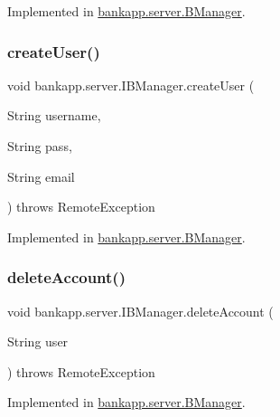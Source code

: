 Implemented in \hyperlink{classbankapp_1_1server_1_1_b_manager_abf7716d220d573ad491f4ee15312aaff}{bankapp.\+server.\+B\+Manager}.

\mbox{\label{interfacebankapp_1_1server_1_1_i_b_manager_a09b3ca29b50f7c662e360a47cea220ae}} 
\subsubsection{\texorpdfstring{create\+User()}{createUser()}}
{\footnotesize\ttfamily void bankapp.\+server.\+I\+B\+Manager.\+create\+User (\begin{DoxyParamCaption}\item[{String}]{username,  }\item[{String}]{pass,  }\item[{String}]{email }\end{DoxyParamCaption}) throws Remote\+Exception}



Implemented in \hyperlink{classbankapp_1_1server_1_1_b_manager_ad98f4af0b4ae0842a58570e6c08a371c}{bankapp.\+server.\+B\+Manager}.

\mbox{\label{interfacebankapp_1_1server_1_1_i_b_manager_aa1f1aee23930d78375c12496e9f47cdf}} 
\subsubsection{\texorpdfstring{delete\+Account()}{deleteAccount()}}
{\footnotesize\ttfamily void bankapp.\+server.\+I\+B\+Manager.\+delete\+Account (\begin{DoxyParamCaption}\item[{String}]{user }\end{DoxyParamCaption}) throws Remote\+Exception}



Implemented in \hyperlink{classbankapp_1_1server_1_1_b_manager_ad8c5c164841d3ad7e25070c6b065bb4d}{bankapp.\+server.\+B\+Manager}.

